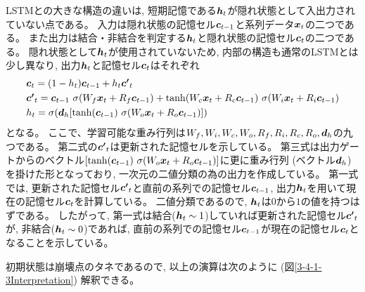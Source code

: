 LSTMとの大きな構造の違いは, 短期記憶である${\mbox{\boldmath{$h$}}}_t$が隠れ状態として入出力されていない点である。
入力は隠れ状態の記憶セル${\mbox{\boldmath{$c$}}}_{t-1}$と系列データ${\mbox{\boldmath{$x$}}}_t$の二つである。
また出力は結合・非結合を判定する${\mbox{\boldmath{$h$}}}_t$と隠れ状態の記憶セル${\mbox{\boldmath{$c$}}}_{t}$の二つである。
隠れ状態として${\mbox{\boldmath{$h$}}}_t$が使用されていないため, 内部の構造も通常のLSTMとは少し異なり, 出力${\mbox{\boldmath{$h$}}}_{t}$と記憶セル${\mbox{\boldmath{$c$}}}_{t}$はそれぞれ
\begin{equation}
 \begin{split}
  &{\mbox{\boldmath{$c$}}}_{t} 
  = (1-h_t) {\mbox{\boldmath{$c$}}}_{t-1} + h_t {\mbox{\boldmath{$c'$}}}_{t}\\
  &{\mbox{\boldmath{$c'$}}}_{t}
  = {\mbox{\boldmath{$c$}}}_{t-1} \  \sigma (W_f {\mbox{\boldmath{$x$}}}_t + R_f {\mbox{\boldmath{$c$}}}_{t-1}) 
  + \tanh (W_c {\mbox{\boldmath{$x$}}}_t + R_c {\mbox{\boldmath{$c$}}}_{t-1}) \  \sigma (W_i {\mbox{\boldmath{$x$}}}_t + R_i {\mbox{\boldmath{$c$}}}_{t-1})\\
  &h_{t} 
  = \sigma ({\mbox{\boldmath{$d$}}}_h [\tanh({\mbox{\boldmath{$c$}}}_{t-1}) \  \sigma (W_o {\mbox{\boldmath{$x$}}}_t + R_o {\mbox{\boldmath{$c$}}}_{t-1}) ])
 \end{split}
\end{equation}
となる。
ここで、学習可能な重み行列は$W_f, W_i, W_c, W_o, R_f, R_i, R_c, R_o, {\mbox{\boldmath{$d$}}}_h$の九つである。
第二式の${\mbox{\boldmath{$c'$}}}_{t}$は更新された記憶セルを示している。
第三式は出力ゲートからのベクトル$[\tanh({\mbox{\boldmath{$c$}}}_{t-1}) \  \sigma (W_o {\mbox{\boldmath{$x$}}}_t + R_o {\mbox{\boldmath{$c$}}}_{t-1})]$に更に重み行列 (ベクトル${\mbox{\boldmath{$d$}}}_h$) を掛けた形となっており, 一次元の二値分類の為の出力を作成している。
第一式では, 更新された記憶セル${\mbox{\boldmath{$c'$}}}_{t}$と直前の系列での記憶セル${\mbox{\boldmath{$c$}}}_{t-1}$, 出力${\mbox{\boldmath{$h$}}}_{t}$を用いて現在の記憶セル${\mbox{\boldmath{$c$}}}_{t}$を計算している。
二値分類であるので, ${\mbox{\boldmath{$h$}}}_{t}$は$0$から$1$の値を持つはずである。
したがって, 第一式は結合(${\mbox{\boldmath{$h$}}}_{t} \sim 1$)していれば更新された記憶セル${\mbox{\boldmath{$c'$}}}_{t}$が, 非結合(${\mbox{\boldmath{$h$}}}_{t} \sim 0$)であれば, 直前の系列での記憶セル${\mbox{\boldmath{$c$}}}_{t-1}$が現在の記憶セル${\mbox{\boldmath{$c$}}}_{t}$となることを示している。

初期状態は崩壊点のタネであるので, 以上の演算は次のように (図\ref{3-4-1-3Interpretation}) 解釈できる。

